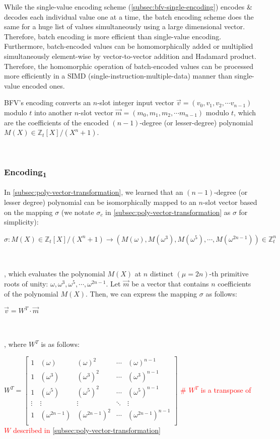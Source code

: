 While the single-value encoding scheme (\autoref{subsec:bfv-single-encoding}) encodes \& decodes each individual value one at a time, the batch encoding scheme does the same for a huge list of values simultaneously using a large dimensional vector. Therefore, batch encoding is more efficient than single-value encoding. Furthermore, batch-encoded values can be homomorphically added or multiplied simultaneously element-wise by vector-to-vector addition and Hadamard product. Therefore, the homomorphic operation of batch-encoded values can be processed more efficiently in a SIMD (single-instruction-multiple-data) manner than single-value encoded ones. 

BFV's encoding converts an $n$-slot integer input vector $\vec{v} = (v_0, v_1, v_2, \cdots v_{n-1})$ modulo $t$ into another $n$-slot vector $\vec{m} = (m_0, m_1, m_2, \cdots m_{n-1})$ modulo $t$, which are the coefficients of the encoded $(n-1)$-degree (or lesser-degree) polynomial $M(X) \in \mathbb{Z}_t[X] / (X^n + 1)$. 

$ $

\subsubsection{\textsf{Encoding\textsubscript{1}}}  
\label{subsubsec:bfv-encoding-1} 

In \autoref{subsec:poly-vector-transformation}, we learned that an $(n-1)$-degree (or lesser degree) polynomial can be isomorphically mapped to an $n$-slot vector based on the mapping $\sigma$ (we notate $\sigma_c$ in \autoref{subsec:poly-vector-transformation} as $\sigma$ for simplicity): 

$\sigma: M(X) \in \mathbb{Z}_t[X]/(X^n + 1) \longrightarrow  (M(\omega),M(\omega^3),M(\omega^5), \cdots, M(\omega^{2n-1})) \in \mathbb{Z}_t^n$

$ $

, which evaluates the polynomial $M(X)$ at $n$ distinct $(\mu=2n)$-th primitive roots of unity: $\omega, \omega^3, \omega^5, \cdots, \omega^{2n-1}$. Let $\vec{m}$ be a vector that contains $n$ coefficients of the polynomial $M(X)$. Then, we can express the mapping $\sigma$ as follows: 

$\vec{v} = W^T \cdot \vec{m}$

$ $

, where $W^T$ is as follows: 

$W^T = \begin{bmatrix}
1 & (\omega) & (\omega)^2 & \cdots & (\omega)^{n-1}\\
1 & (\omega^3) & (\omega^3)^2 & \cdots & (\omega^3)^{n-1}\\
1 & (\omega^5) & (\omega^5)^2 & \cdots & (\omega^5)^{n-1}\\
\vdots & \vdots & \vdots & \ddots & \vdots \\
1 & (\omega^{2n-1}) & (\omega^{2n-1})^2 & \cdots & (\omega^{2n-1})^{n-1}\\
\end{bmatrix}$  \textcolor{red}{ \text{ } \# $W^T$ is a transpose of $W$ described in \autoref{subsec:poly-vector-transformation}}

